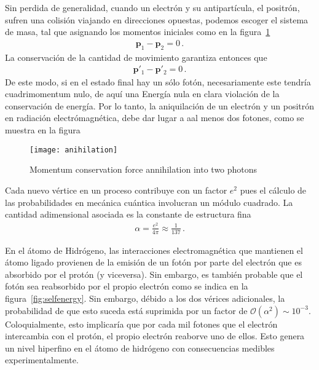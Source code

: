 Sin perdida de generalidad, cuando un electrón y su antipartícula, el positrón, sufren una colisión viajando en direcciones opuestas, podemos escoger el sistema de masa, tal que asignando los momentos iniciales como en la figura~\ref{fig:anihilation}
\begin{align}
  \boldsymbol{p}_1-\boldsymbol{p}_{2}=0\,.
\end{align}
La conservación de la cantidad de movimiento garantiza entonces que
\begin{align}
  \boldsymbol{p}'_1-\boldsymbol{p}'_{2}=0\,.
\end{align}
De este modo, si en el estado final hay un sólo fotón, necesariamente este tendría cuadrimomentum nulo, de aquí una Energía nula  en clara violación de la conservación de energía. Por lo tanto, la aniquilación de un electrón y un positrón en radiación electrómagnética, debe dar lugar a aal menos dos fotones, como se muestra en la figura

\begin{frame}
\begin{figure}
  \centering
  \texttt{[image: anihilation]}
  \caption{Momentum conservation force  annihilation into two photons}
  \label{fig:anihilation}
\end{figure}
\end{frame}

\begin{frame}
Cada nuevo vértice en un proceso contribuye con un factor $e^{2}$ pues el cálculo de las probabilidades en mecánica cuántica involucran un módulo cuadrado. La cantidad adimensional asociada es la constante de estructura fina
\begin{align}
  \alpha=\frac{e^2}{4\pi}\approx \frac{1}{137}\,.
\end{align}

En el átomo de Hidrógeno, las interacciones electromagnética que mantienen el átomo ligado provienen de la emisión de un fotón por parte del electrón que es absorbido por el protón (y viceversa). Sin embargo, es también probable que el fotón sea reabsorbido por el propio electrón como se indica en la figura~\ref{fig:selfenergy}. Sin embargo, débido a los dos vérices adicionales, la probabilidad de que esto suceda está suprimida por un factor de $\mathcal{O}({\alpha}^{2})\sim 10^{-3}$. Coloquialmente, esto implicaría que por cada mil fotones que el electrón intercambia con el protón, el propio electrón reaborve uno de ellos. Esto genera un nivel hiperfino en el átomo de hidrógeno con consecuencias medibles experimentalmente. 
\end{frame}

